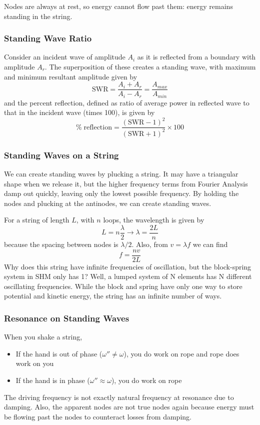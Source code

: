 \documentclass[../PhysicsFormulae.tex]{subfiles}
\begin{document}
Nodes are always at rest, so energy cannot flow past them: energy remains standing in the string. 

\subsubsection{Standing Wave Ratio}
Consider an incident wave of amplitude $A_i$ as it is reflected from a boundary with amplitude $A_r$. The superposition of these creates a standing wave, with maximum and minimum resultant amplitude given by 
\[ \textrm{SWR} = \frac{A_i+A_r}{A_i-A_r} = \frac{A_{max}}{A_{min}} \]
and the percent reflection, defined as ratio of average power in reflected wave to that in the incident wave (times 100), is given by 
\[ \% \; \textrm{reflection} = \frac{(\textrm{SWR}-1)^2}{(\textrm{SWR}+1)^2} \times 100 \]

\subsubsection{Standing Waves on a String}
We can create standing waves by plucking a string. It may have a triangular shape when we release it, but the higher frequency terms from Fourier Analysis damp out quickly, leaving only the lowest possible frequency. By holding the nodes and plucking at the antinodes, we can create standing waves. \bigskip

For a string of length $L$, with $n$ loops, the wavelength is given by 
\[ L = n\frac{\lambda}{2} \rightarrow \lambda = \frac{2L}{n} \]
because the spacing between nodes is $\lambda/2$. Also, from $v = \lambda f$ we can find
\[ f = \frac{nv}{2L} \]
Why does this string have infinite frequencies of oscillation, but the block-spring system in SHM only has 1? Well, a lumped system of N elements has N different oscillating frequencies. While the block and spring have only one way to store potential and kinetic energy, the string has an infinite number of ways. 

\subsubsection{Resonance on Standing Waves}
When you shake a string, 
\begin{itemize}
    \item If the hand is out of phase ($\omega'' \neq \omega$), you do work on rope and rope does work on you
    \item If the hand is in phase ($\omega'' \approx \omega$), you do work on rope
\end{itemize}
The driving frequency is not exactly natural frequency at resonance due to damping. Also, the apparent nodes are not true nodes again because energy must be flowing past the nodes to counteract losses from damping.
\end{document}
